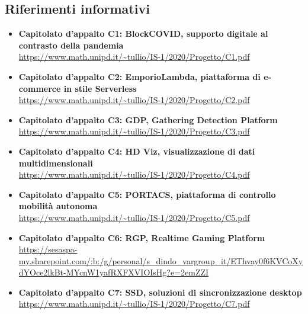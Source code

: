 \subsection{Riferimenti informativi}
\begin{itemize}
	\item \textbf{Capitolato d'appalto C1: BlockCOVID, supporto digitale al contrasto della pandemia} \\ 
	\url{https://www.math.unipd.it/~tullio/IS-1/2020/Progetto/C1.pdf}
	\item \textbf{Capitolato d'appalto C2: EmporioLambda, piattaforma di e-commerce in stile Serverless} \\
	\url{https://www.math.unipd.it/~tullio/IS-1/2020/Progetto/C2.pdf}
	\item \textbf{Capitolato d'appalto C3: GDP, Gathering Detection Platform}\\
	\url{https://www.math.unipd.it/~tullio/IS-1/2020/Progetto/C3.pdf}
	\item \textbf{Capitolato d'appalto C4: HD Viz, visualizzazione di dati multidimensionali}\\
	\url{https://www.math.unipd.it/~tullio/IS-1/2020/Progetto/C4.pdf}
	\item \textbf{Capitolato d'appalto C5: PORTACS, piattaforma di controllo mobilità autonoma}\\
	\url{https://www.math.unipd.it/~tullio/IS-1/2020/Progetto/C5.pdf}
	\item \textbf{Capitolato d'appalto C6: RGP, Realtime Gaming Platform}\\
	\url{https://sesaspa-my.sharepoint.com/:b:/g/personal/s\_dindo_vargroup\_it/EThvay0f6KVCoXydYOce2lkBt-MYcnW1yafRXFXVIOIsHg?e=2emZZI}
	\item \textbf{Capitolato d'appalto C7: SSD, soluzioni di sincronizzazione desktop}\\
	\url{https://www.math.unipd.it/~tullio/IS-1/2020/Progetto/C7.pdf}
\end{itemize}